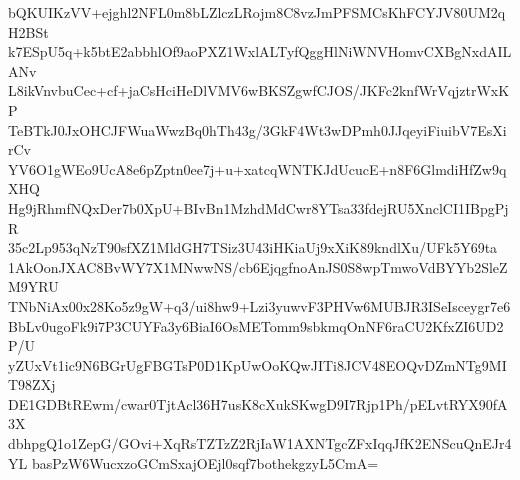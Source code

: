 bQKUIKzVV+ejghl2NFL0m8bLZlczLRojm8C8vzJmPFSMCsKhFCYJV80UM2qH2BSt
k7ESpU5q+k5btE2abbhlOf9aoPXZ1WxlALTyfQggHlNiWNVHomvCXBgNxdAILANv
L8ikVnvbuCec+cf+jaCsHciHeDlVMV6wBKSZgwfCJOS/JKFc2knfWrVqjztrWxKP
TeBTkJ0JxOHCJFWuaWwzBq0hTh43g/3GkF4Wt3wDPmh0JJqeyiFiuibV7EsXirCv
YV6O1gWEo9UcA8e6pZptn0ee7j+u+xatcqWNTKJdUcucE+n8F6GlmdiHfZw9qXHQ
Hg9jRhmfNQxDer7b0XpU+BIvBn1MzhdMdCwr8YTsa33fdejRU5XnclCI1IBpgPjR
35c2Lp953qNzT90sfXZ1MldGH7TSiz3U43iHKiaUj9xXiK89kndlXu/UFk5Y69ta
1AkOonJXAC8BvWY7X1MNwwNS/cb6EjqgfnoAnJS0S8wpTmwoVdBYYb2SleZM9YRU
TNbNiAx00x28Ko5z9gW+q3/ui8hw9+Lzi3yuwvF3PHVw6MUBJR3ISeIsceygr7e6
BbLv0ugoFk9i7P3CUYFa3y6BiaI6OsMETomm9sbkmqOnNF6raCU2KfxZI6UD2P/U
yZUxVt1ic9N6BGrUgFBGTsP0D1KpUwOoKQwJITi8JCV48EOQvDZmNTg9MIT98ZXj
DE1GDBtREwm/cwar0TjtAcl36H7usK8cXukSKwgD9I7Rjp1Ph/pELvtRYX90fA3X
dbhpgQ1o1ZepG/GOvi+XqRsTZTzZ2RjIaW1AXNTgcZFxIqqJfK2ENScuQnEJr4YL
basPzW6WucxzoGCmSxajOEjl0sqf7bothekgzyL5CmA=
